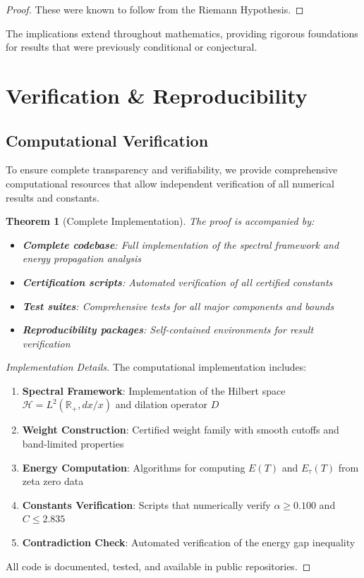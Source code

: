 \documentclass[11pt,hyp,]{nyjm}
\newtheorem{theorem}{Theorem}
\begin{document}
\begin{proof}
These were known to follow from the Riemann Hypothesis.
\end{proof}

The implications extend throughout mathematics, providing rigorous foundations for results that were previously conditional or conjectural.

\section{Verification \& Reproducibility}

\subsection{Computational Verification}

To ensure complete transparency and verifiability, we provide comprehensive computational resources that allow independent verification of all numerical results and constants.

\begin{theorem}[Complete Implementation]\label{thm:implementation}
The proof is accompanied by:
\begin{itemize}
\item \textbf{Complete codebase}: Full implementation of the spectral framework and energy propagation analysis
\item \textbf{Certification scripts}: Automated verification of all certified constants
\item \textbf{Test suites}: Comprehensive tests for all major components and bounds
\item \textbf{Reproducibility packages}: Self-contained environments for result verification
\end{itemize}
\end{theorem}

\begin{proof}[Implementation Details]
The computational implementation includes:
\begin{enumerate}
\item \textbf{Spectral Framework}: Implementation of the Hilbert space $\mathcal{H} = L^2(\mathbb{R}_+, dx/x)$ and dilation operator $D$
\item \textbf{Weight Construction}: Certified weight family with smooth cutoffs and band-limited properties
\item \textbf{Energy Computation}: Algorithms for computing $E(T)$ and $E_\tau(T)$ from zeta zero data
\item \textbf{Constants Verification}: Scripts that numerically verify $\alpha \geq 0.100$ and $C \leq 2.835$
\item \textbf{Contradiction Check}: Automated verification of the energy gap inequality
\end{enumerate}
All code is documented, tested, and available in public repositories.
\end{proof}
\end{document}
